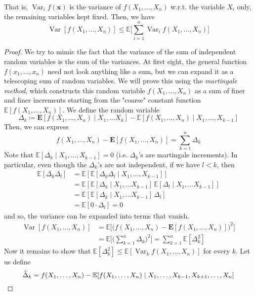 \documentclass{article}
\DeclareMathOperator{\Var}{Var}
\begin{document}
\begin{theorem}
That is, $\Var_i f(\mathbf{x})$ is the variance of $f(X_1, \ldots, X_n)$ w.r.t. the variable $X_i$ only, the remaining variables kept fixed. Then, we have 
\[\Var[f(X_1, \ldots, X_n)] \leq \mathbb{E} \bigg[ \sum_{i=1}^n \Var_i f(X_1, \ldots, X_n) \bigg] \]
\end{theorem}
\begin{proof}
We try to mimic the fact that the variance of the sum of independent random variables is the sum of the variances. At first sight, the general function $f(x_1, \ldots, x_n)$ need not look anything like a sum, but we can expand it as a telescoping sum of random variables. We will prove this using the \textit{martingale method}, which constructs this random variable $f(X_1, \ldots, X_n)$ as a sum of finer and finer increments starting from the "coarse" constant function $\mathbb{E}[f(X_1, \ldots, X_n)]$. We define the random variable 
\[\Delta_k \coloneqq \mathbf{E}[ f(X_1, \ldots, X_n) \mid X_1, \ldots X_k] - \mathbb{E}[ f(X_1, \ldots, X_n) \mid X_1, \ldots, X_{k-1}]\]
Then, we can express 
\[f( X_1, \ldots, X_n) - \mathbf{E}[ f(X_1, \ldots, X_n)] = \sum_{k=1}^n \Delta_k\]
Note that $\mathbb{E}[\Delta_k \mid X_1, \ldots, X_{k-1}] = 0$ (i.e. $\Delta_k$'s are martingale increments). In particular, even though the $\Delta_k$'s are not independent, if we have $l < k$, then 
\begin{align*}
    \mathbb{E}[ \Delta_k \Delta_l] & = \mathbb{E}[ \mathbb{E}[\Delta_k \Delta_l \mid X_1, \ldots, X_{k-1}]] \\
    & = \mathbb{E}[ \mathbb{E}[\Delta_k \mid X_1, \ldots X_{k-1} ] \, \mathbb{E}[\Delta_l \mid X_1, \ldots X_{k-1} ]] \\
    & = \mathbb{E}[ \mathbb{E}[\Delta_k \mid X_1, \ldots X_{k-1} ] \, \Delta_l] \\
    & = \mathbb{E}[0 \cdot \Delta_l] = 0
\end{align*}
and so, the variance can be expanded into terms that vanish. 
\begin{align*}
    \Var[ f(X_1, \ldots, X_n)] & = \mathbb{E} \big[ \big( f( X_1, \ldots, X_n) - \mathbf{E}[ f(X_1, \ldots, X_n)] \big)^2\big] \\
    & = \mathbb{E} \bigg[ \bigg( \sum_{k=1}^n \Delta_k \bigg)^2 \bigg] = \sum_{k=1}^n \mathbb{E}[ \Delta_k^2]
\end{align*}
Now it remains to show that $\mathbb{E}[\Delta_k^2] \leq \mathbb{E}[\Var_k f(X_1, \ldots, X_n)]$ for every $k$. Let us define 
\[\Tilde{\Delta}_k = f(X_1, \ldots, X_n) - \mathbb{E}[f(X_1, \ldots, X_n) \mid X_1, \ldots, X_{k-1}, X_{k+1}, \ldots, X_n]\]

\end{proof}
\end{document}
